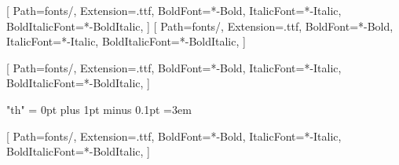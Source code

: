 




\setdefaultlanguage{thai}


\newfontfamily{}[
  Path=fonts/,
  Extension=.ttf,
  BoldFont=*-Bold,
  ItalicFont=*-Italic,
  BoldItalicFont=*-BoldItalic,
]
\newfontfamily{}[
  Path=fonts/,
  Extension=.ttf,
  BoldFont=*-Bold,
  ItalicFont=*-Italic,
  BoldItalicFont=*-BoldItalic,
]

\setmainfont[Scale=1.23,LetterSpace=0,WordSpace=1.0,FakeStretch=1.0,Mapping=tex-text]{THSarabunNew.ttf}[
  Path=fonts/,
  Extension=.ttf,
  BoldFont=*-Bold,
  ItalicFont=*-Italic,
  BoldItalicFont=*-BoldItalic,
]

\XeTeXlinebreaklocale "th"
\XeTeXlinebreakskip = 0pt plus 1pt minus 0.1pt
\emergencystretch=3em

\newfontfamily{}[
  Path=fonts/,
  Extension=.ttf,
  BoldFont=*-Bold,
  ItalicFont=*-Italic,
  BoldItalicFont=*-BoldItalic,
]


\newdimen\bodyfontsize
\bodyfontsize=16pt

